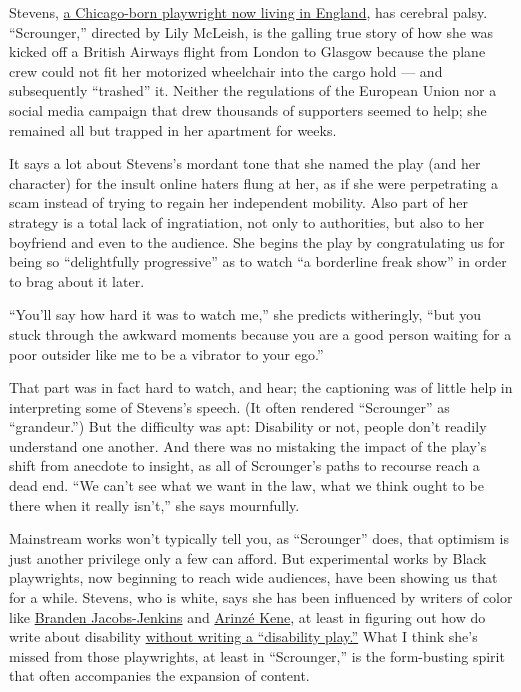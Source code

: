 Stevens, \href{https://www.athenastevens.com/}{a Chicago-born playwright
now living in England}, has cerebral palsy. ``Scrounger,'' directed by
Lily McLeish, is the galling true story of how she was kicked off a
British Airways flight from London to Glasgow because the plane crew
could not fit her motorized wheelchair into the cargo hold --- and
subsequently ``trashed'' it. Neither the regulations of the European
Union nor a social media campaign that drew thousands of supporters
seemed to help; she remained all but trapped in her apartment for weeks.

It says a lot about Stevens's mordant tone that she named the play (and
her character) for the insult online haters flung at her, as if she were
perpetrating a scam instead of trying to regain her independent
mobility. Also part of her strategy is a total lack of ingratiation, not
only to authorities, but also to her boyfriend and even to the audience.
She begins the play by congratulating us for being so ``delightfully
progressive'' as to watch ``a borderline freak show'' in order to brag
about it later.

``You'll say how hard it was to watch me,'' she predicts witheringly,
``but you stuck through the awkward moments because you are a good
person waiting for a poor outsider like me to be a vibrator to your
ego.''

That part was in fact hard to watch, and hear; the captioning was of
little help in interpreting some of Stevens's speech. (It often rendered
``Scrounger'' as ``grandeur.'') But the difficulty was apt: Disability
or not, people don't readily understand one another. And there was no
mistaking the impact of the play's shift from anecdote to insight, as
all of Scrounger's paths to recourse reach a dead end. ``We can't see
what we want in the law, what we think ought to be there when it really
isn't,'' she says mournfully.

Mainstream works won't typically tell you, as ``Scrounger'' does, that
optimism is just another privilege only a few can afford. But
experimental works by Black playwrights, now beginning to reach wide
audiences, have been showing us that for a while. Stevens, who is white,
says she has been influenced by writers of color like
\href{https://www.nytimes.com/2014/11/23/magazine/branden-jacobs-jenkins-isnt-writing-about-race.html}{Branden
Jacobs-Jenkins} and
\href{https://www.theguardian.com/stage/2019/apr/27/arinze-kene-interview-misty-death-of-a-salesman}{Arinzé
Kene}, at least in figuring out how do write about disability
\href{https://www.larktheatre.org/blog/athena-stevens-box-ticking-narrative-control/}{without
writing a ``disability play.''} What I think she's missed from those
playwrights, at least in ``Scrounger,'' is the form-busting spirit that
often accompanies the expansion of content.

